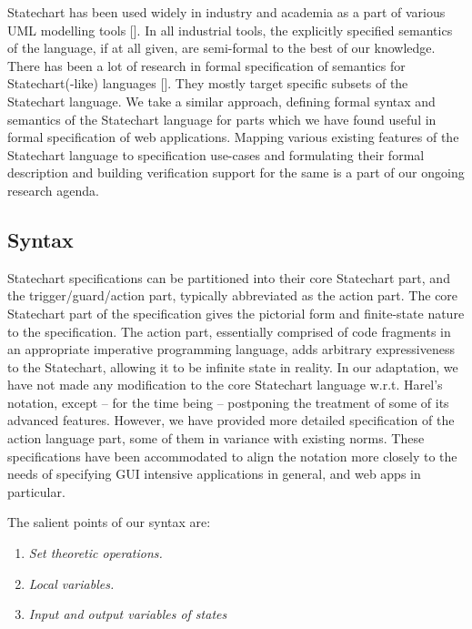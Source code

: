 \documentclass[12pt,a4paper]{article}
\begin{document}
Statechart has been used widely in industry and academia as a part of various UML modelling tools []. In all industrial tools, the explicitly specified semantics of the language, if at all given, are semi-formal to the best of our knowledge. There has been a lot of research in formal specification of semantics for Statechart(-like) languages []. They mostly target specific subsets of the Statechart language. We take a similar approach, defining formal syntax and semantics of the Statechart language for parts which we have found useful in formal specification of web applications. Mapping various existing features of the Statechart language to specification use-cases and formulating their formal description and building verification support for the same is a part of our ongoing research agenda.

\subsection{Syntax}
\begin{scriptsize}

\end{scriptsize}

Statechart specifications can be partitioned into their core Statechart part, and the trigger/guard/action part, typically abbreviated as the action part. The core Statechart part of the specification gives the pictorial form and finite-state nature to the specification. The action part, essentially comprised of code fragments in an appropriate imperative programming language, adds arbitrary expressiveness to the Statechart, allowing it to be infinite state in reality. In our adaptation, we have not made any modification to the core Statechart language w.r.t. Harel's notation, except -- for the time being -- postponing the treatment of some of its advanced features. However, we have provided more detailed specification of the action language part, some of them in variance with existing norms. These specifications have been accommodated to align the notation more closely to the needs of specifying GUI intensive applications in general, and web apps in particular.


The salient points of our syntax are:
\begin{enumerate}
	\item \emph{Set theoretic operations.}
	\item \emph{Local variables.}
	\item \emph{Input and output variables of states}
\end{enumerate}
\end{document}
